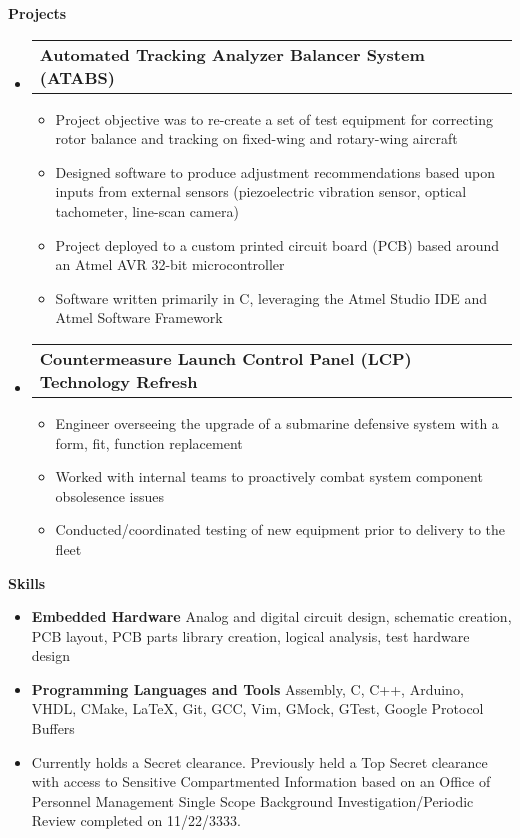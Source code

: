 \documentclass[letterpaper,12pt]{article}
\makeatletter
\def \entryspacing {-0pt}
\renewcommand{\section}[2]{\vspace{5pt}
  \colorbox{secondary}{\color{white}\raggedbottom\normalsize\textbf{{#1}{\hspace{7pt}#2}}}
}
\newcommand{\resumeEntryStart}{\begin{itemize}[leftmargin=2.5mm]}
\newcommand{\resumeEntryEnd}{\end{itemize}\vspace{\entryspacing}}
\newcommand{\resumeItemListStart}{\begin{itemize}[leftmargin=4.5mm]}
\newcommand{\resumeItemListEnd}{\end{itemize}}
\newcommand{\resumeItem}[1]{
  \item\small{
    {#1 \vspace{-2pt}}
  }
}
\newcommand{\resumeEntryTD}[2]{
  \vspace{-1pt}\item[]
    \begin{tabular*}{0.97\textwidth}{l@{\extracolsep{\fill}}r}
      \textbf{\color{primary}#1} & {\firabook\color{accent}\small#2} \\
    \end{tabular*}\vspace{-6pt}
}
\newcommand{\resumeEntryS}[2]{
  \item[]\small{
    \textbf{\color{primary}#1 }{ #2 \vspace{-6pt}}
  }
}
\newcommand{\resumeEntryNote}[1]{
  \item[]\small{
    { #1 \vspace{-6pt}}
  }
}
\makeatother
\begin{document}

\section{\faLaptopCode}{Projects}

  \resumeEntryStart
    \resumeEntryTD
      {Automated Tracking Analyzer Balancer System (ATABS)}{}
    \resumeItemListStart
      \resumeItem
		{Project objective was to re-create a set of test equipment for correcting rotor balance and tracking on fixed-wing and rotary-wing aircraft}
      \resumeItem
		{Designed software to produce adjustment recommendations based upon inputs from external sensors (piezoelectric vibration sensor, optical tachometer, line-scan camera)}
	  \resumeItem
		{Project deployed to a custom printed circuit board (PCB) based around an Atmel AVR 32-bit microcontroller}
	  \resumeItem
		{Software written primarily in C, leveraging the Atmel Studio IDE and Atmel Software Framework}
    \resumeItemListEnd
  \resumeEntryEnd

  \resumeEntryStart
    \resumeEntryTD
      {Countermeasure Launch Control Panel (LCP) Technology Refresh}{}
    \resumeItemListStart
      \resumeItem
		{Engineer overseeing the upgrade of a submarine defensive system with a form, fit, function replacement}
	  \resumeItem {Worked with internal teams to proactively combat system component obsolesence issues}
	  \resumeItem {Conducted/coordinated testing of new equipment prior to delivery to the fleet}
    \resumeItemListEnd
  \resumeEntryEnd

\section{\faToolbox}{Skills}
 \resumeEntryStart
  \resumeEntryS
	{Embedded Hardware}
	{Analog and digital circuit design, schematic creation, PCB layout, PCB parts library creation, logical analysis, test hardware design}
  \resumeEntryS
	{Programming Languages and Tools}
	{Assembly, C, C++, Arduino, VHDL, CMake, \LaTeX, Git, GCC, Vim, GMock, GTest, Google Protocol Buffers}

  \resumeEntryNote
	{Currently holds a Secret clearance. Previously held a Top Secret clearance with access to Sensitive Compartmented Information based on an Office of Personnel Management Single Scope Background Investigation/Periodic Review completed on 11/22/3333.}
 \resumeEntryEnd
\end{document}
